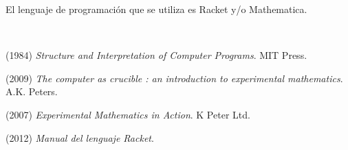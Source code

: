 \begin{titlepage}
\begin{minipage}{0.85\linewidth}
\begin{minipage}{0.85\linewidth}
\begin{resumen}
El lenguaje de programaci\'on  que se utiliza es Racket y/o Mathematica.
     \end{resumen}
\end{minipage}
\vspace*{5pt}\\
\footnotesize
%  
    
\end{minipage}
\vspace{5pt}
\begin{thebibliography}{99}
 (1984) {\it Structure and 
Interpretation of Computer Programs}.  MIT Press.

 (2009) {\it The computer as crucible : an 
introduction to experimental 
mathematics}.   A.K. Peters.


 (2007) {\it Experimental 
Mathematics in Action}.    K Peter Ltd.


 (2012) {\it Manual del lenguaje Racket}.  

\end{thebibliography}
\end{titlepage}























